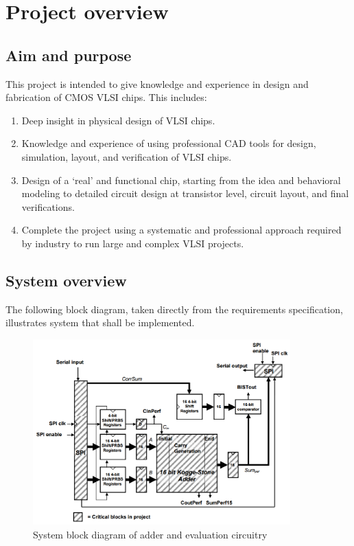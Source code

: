 \section{Project overview}


\subsection{Aim and purpose}
This project is intended to give knowledge and experience in design and fabrication of CMOS VLSI chips. This includes:
\begin{enumerate}
 \item Deep insight in physical design of VLSI chips.
 \item Knowledge and experience of using professional CAD tools for design, simulation, layout, and verification of VLSI chips.
 \item Design of a ‘real’ and functional chip, starting from the idea and behavioral modeling to detailed circuit design at transistor level, circuit layout, and final verifications.
 \item Complete the project using a systematic and professional approach required by industry to run large and complex VLSI projects.
\end{enumerate}

\subsection{System overview}
The following block diagram, taken directly from the requirements specification, illustrates system that shall be implemented.
\begin{figure}[H]
  \begin{center}
    \includegraphics[keepaspectratio=true,width=375px]{grafik/block.png}
    \caption{System block diagram of adder and evaluation circuitry}
    \label{organisationsplan}
  \end{center}
\end{figure}